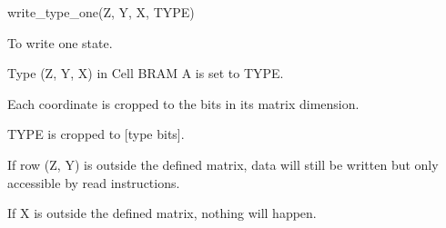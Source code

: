 

\format
write\_type\_one(Z, Y, X, TYPE)

\purpose

To write one state.

\description

Type (Z, Y, X) in Cell BRAM A is set to TYPE.

\notes

Each coordinate is cropped to the bits in its matrix dimension.

TYPE is cropped to [type bits].

If row (Z, Y) is outside the defined matrix, data will still be written but only accessible by read instructions.

If X is outside the defined matrix, nothing will happen.
